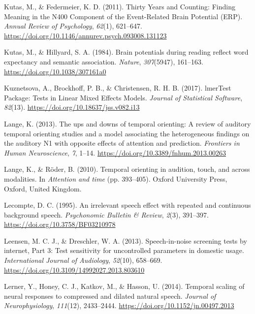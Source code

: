 \documentclass[a4paper, nobind]{templates/ociamthesis}
\newlength{\cslhangindent}
\newenvironment{CSLReferences}[2] %
 {%
  \setlength{\parindent}{0pt}
  \ifodd #1
  \let\oldpar\par
  \def\par{\hangindent=\cslhangindent\oldpar}
  \fi
  \setlength{\parskip}{1mm}
  \setlength{\baselineskip}{6mm}
 }%
 {}
\begin{document}
\begin{CSLReferences}{1}{0}
\leavevmode{}%
Kutas, M., \& Federmeier, K. D. (2011). Thirty Years and Counting: Finding Meaning in the N400 Component of the Event-Related Brain Potential (ERP). \emph{Annual Review of Psychology}, \emph{62}(1), 621--647. \url{https://doi.org/10.1146/annurev.psych.093008.131123}

\leavevmode{}%
Kutas, M., \& Hillyard, S. A. (1984). Brain potentials during reading reflect word expectancy and semantic association. \emph{Nature}, \emph{307}(5947), 161--163. \url{https://doi.org/10.1038/307161a0}

\leavevmode{}%
Kuznetsova, A., Brockhoff, P. B., \& Christensen, R. H. B. (2017). lmerTest Package: Tests in Linear Mixed Effects Models. \emph{Journal of Statistical Software}, \emph{82}(13). \url{https://doi.org/10.18637/jss.v082.i13}

\leavevmode{}%
Lange, K. (2013). {The ups and downs of temporal orienting: A review of auditory temporal orienting studies and a model associating the heterogeneous findings on the auditory N1 with opposite effects of attention and prediction}. \emph{Frontiers in Human Neuroscience}, \emph{7}, 1--14. \url{https://doi.org/10.3389/fnhum.2013.00263}

\leavevmode{}%
Lange, K., \& Röder, B. (2010). Temporal orienting in audition, touch, and across modalities. In \emph{Attention and time} (pp. 393--405). Oxford University Press, Oxford, United Kingdom.

\leavevmode{}%
Lecompte, D. C. (1995). An irrelevant speech effect with repeated and continuous background speech. \emph{Psychonomic Bulletin \& Review}, \emph{2}(3), 391--397. \url{https://doi.org/10.3758/BF03210978}

\leavevmode{}%
Leensen, M. C. J., \& Dreschler, W. A. (2013). {Speech-in-noise screening tests by internet, Part 3: Test sensitivity for uncontrolled parameters in domestic usage}. \emph{International Journal of Audiology}, \emph{52}(10), 658--669. \url{https://doi.org/10.3109/14992027.2013.803610}

\leavevmode{}%
Lerner, Y., Honey, C. J., Katkov, M., \& Hasson, U. (2014). {Temporal scaling of neural responses to compressed and dilated natural speech}. \emph{Journal of Neurophysiology}, \emph{111}(12), 2433--2444. \url{https://doi.org/10.1152/jn.00497.2013}


\end{CSLReferences}
\end{document}
